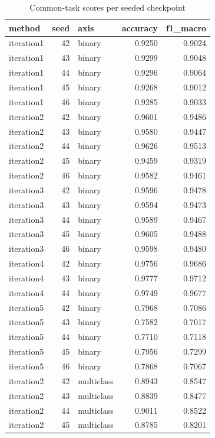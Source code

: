 \begin{table}
\caption{Common-task scores per seeded checkpoint}
\begin{tabular}{lrlrr}
\toprule
method & seed & axis & accuracy & f1\_macro \\
\midrule
iteration1 & 42 & binary & 0.9250 & 0.9024 \\
iteration1 & 43 & binary & 0.9299 & 0.9048 \\
iteration1 & 44 & binary & 0.9296 & 0.9064 \\
iteration1 & 45 & binary & 0.9268 & 0.9012 \\
iteration1 & 46 & binary & 0.9285 & 0.9033 \\
iteration2 & 42 & binary & 0.9601 & 0.9486 \\
iteration2 & 43 & binary & 0.9580 & 0.9447 \\
iteration2 & 44 & binary & 0.9626 & 0.9513 \\
iteration2 & 45 & binary & 0.9459 & 0.9319 \\
iteration2 & 46 & binary & 0.9582 & 0.9461 \\
iteration3 & 42 & binary & 0.9596 & 0.9478 \\
iteration3 & 43 & binary & 0.9594 & 0.9473 \\
iteration3 & 44 & binary & 0.9589 & 0.9467 \\
iteration3 & 45 & binary & 0.9605 & 0.9488 \\
iteration3 & 46 & binary & 0.9598 & 0.9480 \\
iteration4 & 42 & binary & 0.9756 & 0.9686 \\
iteration4 & 43 & binary & 0.9777 & 0.9712 \\
iteration4 & 44 & binary & 0.9749 & 0.9677 \\
iteration5 & 42 & binary & 0.7968 & 0.7086 \\
iteration5 & 43 & binary & 0.7582 & 0.7017 \\
iteration5 & 44 & binary & 0.7710 & 0.7118 \\
iteration5 & 45 & binary & 0.7956 & 0.7299 \\
iteration5 & 46 & binary & 0.7868 & 0.7067 \\
iteration2 & 42 & multiclass & 0.8943 & 0.8547 \\
iteration2 & 43 & multiclass & 0.8839 & 0.8477 \\
iteration2 & 44 & multiclass & 0.9011 & 0.8522 \\
iteration2 & 45 & multiclass & 0.8785 & 0.8201 \\

\end{tabular}
\end{table}
